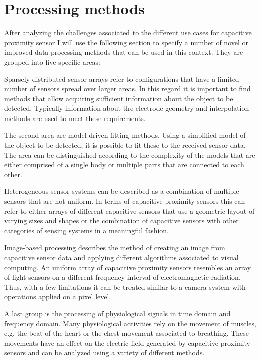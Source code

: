 \section{Processing methods}
After analyzing the challenges associated to the different use cases for capacitive proximity sensor I will use the following section to specify a number of novel or improved data processing methods that can be used in this context. They are grouped into five specific areas:

Sparsely distributed sensor arrays refer to configurations that have a limited number of sensors spread over larger areas. In this regard it is important to find methods that allow acquiring sufficient information about the object to be detected. Typically information about the electrode geometry and interpolation methods are used to meet these requirements.

The second area are model-driven fitting methods. Using a simplified model of the object to be detected, it is possible to fit these to the received sensor data. The area can be distinguished according to the complexity of the models that are either comprised of a single body or multiple parts that are connected to each other.

Heterogeneous sensor systems can be described as a combination of multiple sensors that are not uniform. In terms of capacitive proximity sensors this can refer to either arrays of different capacitive sensors that use a geometric layout of varying sizes and shapes or the combination of capacitive sensors with other categories of sensing systems in a meaningful fashion.

Image-based processing describes the method of creating an image from capacitive sensor data and applying different algorithms associated to visual computing. An uniform array of capacitive proximity sensors resembles an array of light sensors on a different frequency interval of electromagnetic radiation. Thus, with a few limitations it can be treated similar to a camera system with operations applied on a pixel level.

A last group is the processing of physiological signals in time domain and frequency domain. Many physiological activities rely on the movement of muscles, e.g. the beat of the heart or the chest movement associated to breathing. These movements have an effect on the electric field generated by capacitive proximity sensors and can be analyzed using a variety of different methods.







